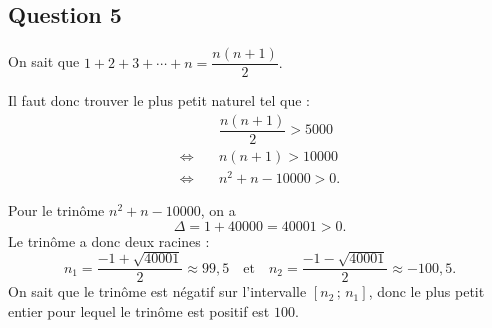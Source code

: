 \documentclass[10pt]{article}
\begin{document}
	\subsection*{Question 5}
	On sait que \(1 + 2 + 3 + \cdots + n = \dfrac{n(n + 1)}{2}.\)
	
	Il faut donc trouver le plus petit naturel tel que :
	\begin{align*}
		&\dfrac{n(n + 1)}{2} > 5000 \\
		\iff \quad & n(n + 1) > 10000 \\
		\iff \quad & n^2 + n - 10000 > 0.
	\end{align*}
	
	Pour le trinôme \(n^2 + n - 10000\), on a 
	\[
	\Delta = 1 + 40000 = 40001 > 0.
	\]
	Le trinôme a donc deux racines :
	\[
	n_1 = \dfrac{-1 + \sqrt{40001}}{2} \approx 99,5 \quad \text{et} \quad n_2 = \dfrac{-1 - \sqrt{40001}}{2} \approx -100,5.
	\]
	On sait que le trinôme est négatif sur l'intervalle \([n_2\,;\,n_1]\), donc le plus petit entier pour lequel le trinôme est positif est \(100\).
\end{document}
